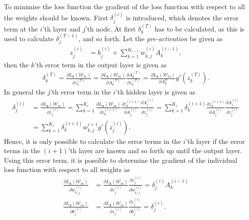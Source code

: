 To minimise the loss function the gradient of the loss function with respect to all the weights should be known. First $\delta^{(i)}_{j}$ is introduced, which denotes the error term at the $i$'th layer and $j$'th node. At first $\delta^{(T)}_k$ has to be calculated, as this is used to calculate $\delta^{(T-1)}_j$, and so forth. Let the \emph{pre-activation} be given as
\begin{align*}
    z^{(i)}_{j} &= b_{j}^{(i)} + \sum_{k=1}^{K_{i-1}} w_{k,j}^{(i)}A_k^{(i-1)},
\end{align*}
then the $k$'th error term in the output layer is given as
\begin{align*}
    \delta^{(T)}_{k} =  \frac{\partial L_{\bm{x}}(\mathcal{W}_m)}{\partial z^{(T)}_{k}} = \frac{\partial L_{\bm{x}}(\mathcal{W}_m)}{\partial A_k^{(T)}}\frac{\partial A_k^{(T)}}{\partial z^{(T)}_{k}} = \frac{\partial L_{\bm{x}}(\mathcal{W}_m)}{\partial A_k^{T}} g'(z^{(T)}_{k}).
\end{align*}
In general the $j$'th error term in the $i$'th hidden layer is given as
\begin{align*}
    \delta^{(i)}_{j} &= \frac{\partial L_{\bm{x}}(\mathcal{W}_m)}{\partial z^{(i)}_{j}} = \sum_{k = 1}^{K_{i}} \frac{\partial L_{\bm{x}}(\mathcal{W}_m)}{\partial z^{(i+1)}_{k}} \frac{\partial z^{(i+1)}_{k}}{\partial A^{(i)}_{j}}\frac{\partial A^{(i)}_{j}}{\partial z^{(i)}_{j}} =\sum_{k = 1}^{K_{i}} \delta^{(i+1)}_{k} \frac{\partial z^{(i+1)}_{k}}{\partial A^{(i)}_{j}}\frac{\partial A^{(i)}_{j}}{\partial z^{(i)}_{j}}\\
    &= \sum_{k = 1}^{K_{i}} \delta^{(i+1)}_{k} w_{k,j}^{i+1}g'\left(z_{j}^{(i)}\right).
\end{align*}
Hence, it is only possible to calculate the error terms in the $i$'th layer if the error terms in the $(i+1)$'th layer are known and so forth up until the output layer. Using this error term, it is possible to determine the gradient of the individual loss function with respect to all weights as
\begin{align*}
    \frac{\partial L_{\bm{x}}(\mathcal{W}_m)}{\partial w_{k,j}^{(i)}} &= \frac{\partial L_{\bm{x}}(\mathcal{W}_m)}{\partial z^{(i)}_{j}}\frac{\partial z^{(i)}_{j}}{\partial w_{k,j}^{(i)}} = \delta^{(i)}_{j} A_k^{(i-1)}\\
    \frac{\partial L_{\bm{x}}(\mathcal{W}_m)}{\partial b_{j}^{(i)}} &= \frac{\partial L_{\bm{x}}(\mathcal{W}_m)}{\partial z^{(i)}_{j}}\frac{\partial z^{(i)}_{j}}{\partial b_{j}^{(i)}} = \delta^{(i)}_{j}.
\end{align*}

